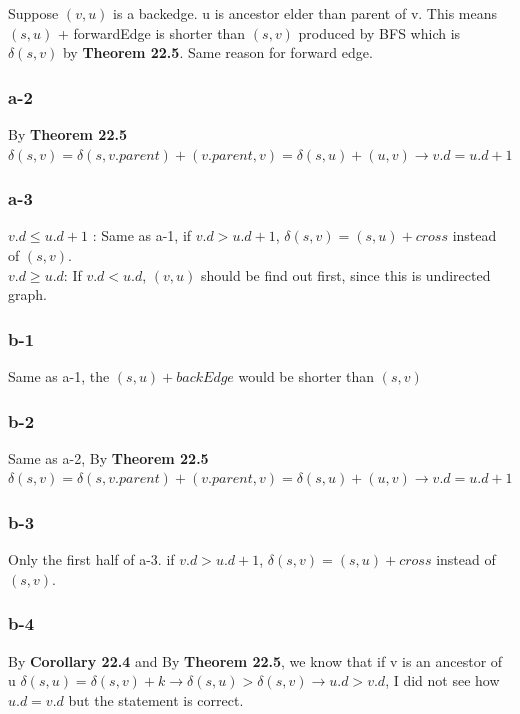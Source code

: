 \documentclass[]{article}
\begin{document}
Suppose $(v,u)$ is a backedge. u is ancestor elder than parent of v. This means $(s,u)$ + forwardEdge is shorter than $(s,v)$ produced by BFS which is $\delta(s,v)$ by \textbf{Theorem 22.5}. Same reason for forward edge.   

\subsubsection{a-2}

By \textbf{Theorem 22.5} $\delta(s,v) = \delta(s,v.parent) + (v.parent, v) = \delta(s,u) + (u,v) \rightarrow v.d = u.d + 1$

\subsubsection{a-3}

$v.d \le u.d + 1$ : Same as a-1, if $v.d > u.d + 1$, $\delta(s,v) = (s,u) + cross$ instead of $(s,v)$. \\
$v.d \ge u.d$: If $v.d < u.d$, $(v,u)$ should be find out first, since this is undirected graph. 

\subsubsection{b-1}

Same as a-1, the $(s, u) + backEdge$ would be shorter than $(s, v)$

\subsubsection{b-2}

Same as a-2, By \textbf{Theorem 22.5} $\delta(s,v) = \delta(s,v.parent) + (v.parent, v) = \delta(s,u) + (u,v) \rightarrow v.d = u.d + 1$

\subsubsection{b-3}

Only the first half of a-3. if $v.d > u.d + 1$, $\delta(s,v) = (s,u) + cross$ instead of $(s,v)$. 
\subsubsection{b-4}

By \textbf{Corollary 22.4} and By \textbf{Theorem 22.5}, we know that if v is an ancestor of u $\delta (s, u) = \delta(s, v) + k \rightarrow \delta(s, u) > \delta (s, v) \rightarrow u.d > v.d$, I did not see how $u.d = v.d$ but the statement is correct.
\end{document}
